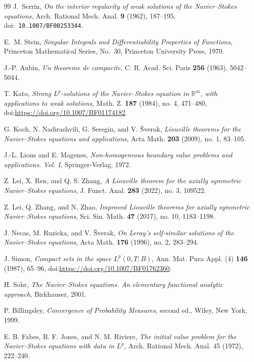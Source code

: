 \documentclass[11pt]{amsart}
\theoremstyle{plain}
\theoremstyle{definition}
\theoremstyle{remark}
\numberwithin{equation}{section}
\begin{document}
\begin{thebibliography}{99}
J.~Serrin,
\emph{On the interior regularity of weak solutions of the Navier--Stokes
 equations},
Arch. Rational Mech. Anal. \textbf{9} (1962), 187--195,
doi:\ \nolinkurl{10.1007/BF00253344}.

E.~M. Stein,
\emph{Singular Integrals and Differentiability Properties of Functions},
Princeton Mathematical Series, No.~30, Princeton University Press, 1970.

J.-P. Aubin,
\emph{Un theoreme de compacite},
C. R. Acad. Sci. Paris \textbf{256} (1963), 5042--5044.

T. Kato,
\emph{Strong \(L^p\)-solutions of the Navier--Stokes equation in
\(\mathbb R^m\), with applications to weak solutions},
Math. Z. \textbf{187} (1984), no. 4, 471--480,
doi:\url{https://doi.org/10.1007/BF01174182}.

G. Koch, N. Nadirashvili, G. Seregin, and V. \v{S}verak,
\emph{Liouville theorems for the Navier--Stokes equations and applications},
Acta Math. \textbf{203} (2009), no. 1, 83--105.

J.-L. Lions and E. Magenes,
\emph{Non-homogeneous boundary value problems and applications. Vol. I},
Springer-Verlag, 1972.

Z. Lei, X. Ren, and Q. S. Zhang,
\emph{A Liouville theorem for the axially symmetric Navier--Stokes equations},
J. Funct. Anal. \textbf{283} (2022), no. 3, 109522.

Z. Lei, Q. Zhang, and N. Zhao,
\emph{Improved Liouville theorems for axially symmetric Navier--Stokes equations},
Sci. Sin. Math. \textbf{47} (2017), no. 10, 1183--1198.

J. Necas, M. Ruzicka, and V. \v{S}verak,
\emph{On Leray's self-similar solutions of the Navier--Stokes equations},
Acta Math. \textbf{176} (1996), no. 2, 283--294.

J. Simon,
\emph{Compact sets in the space \(L^p(0,T;B)\)},
Ann. Mat. Pura Appl. (4) \textbf{146} (1987), 65--96,
doi:\url{https://doi.org/10.1007/BF01762360}.

H. Sohr,
\emph{The Navier--Stokes equations. An elementary functional analytic approach},
Birkhauser, 2001.

P. Billingsley,
\emph{Convergence of Probability Measures}, second ed.,
Wiley, New York, 1999.

E. B. Fabes, B. F. Jones, and N. M. Riviere,
\emph{The initial value problem for the Navier--Stokes equations with data in
\(L^p\)},
Arch. Rational Mech. Anal. 45 (1972), 222--240.


\end{thebibliography}
\end{document}
